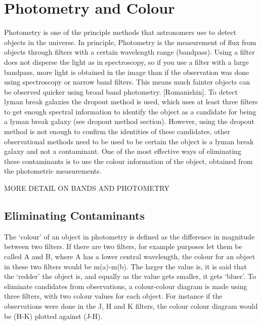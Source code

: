 
\section{Photometry and Colour} %
\label{section:Photometry_Colour}

Photometry is one of the principle methods that astronomers use to detect objects in the universe. In principle, Photometry is the measurement of flux from objects through filters with a certain wavelength range (bandpass). Using a filter does not disperse the light as in spectroscopy, so if you use a filter with a large bandpass, more light is obtained in the image than if the observation was done using spectroscopy or narrow band filters. This means much fainter objects can be observed quicker using broad band photometry. [Romanishin]. To detect lyman break galaxies the dropout method is used, which uses at least three filters to get enough spectral information to identify the object as a candidate for being a lyman break galaxy (see dropout method section). However,  using the dropout method is not enough to confirm the identities of these candidates, other observational methods need to be used to be certain the object is a lyman break galaxy and not a contaminant. One of the most effective ways of eliminating these contaminants is to use the colour information of the object, obtained from the photometric measurements.

MORE DETAIL ON BANDS AND PHOTOMETRY

    
    \subsection{Eliminating Contaminants} %
    \label{sub:Eliminating_Contanimants}

 The ‘colour’ of an object in photometry is defined as the difference in magnitude between two filters.  If there are two filters, for example purposes let them be called A and B, where A has a lower central wavelength, the colour for an object in these two filters would be  m(a)-m(b). The larger the value is, it is said that the ‘redder’ the object is, and equally as the value gets smaller, it gets ‘bluer’. To eliminate candidates from observations, a colour-colour diagram is made using three filters, with two colour values for each object. For instance if the observations were done in the J, H and K filters, the colour colour diagram would be (H-K) plotted against (J-H). 

